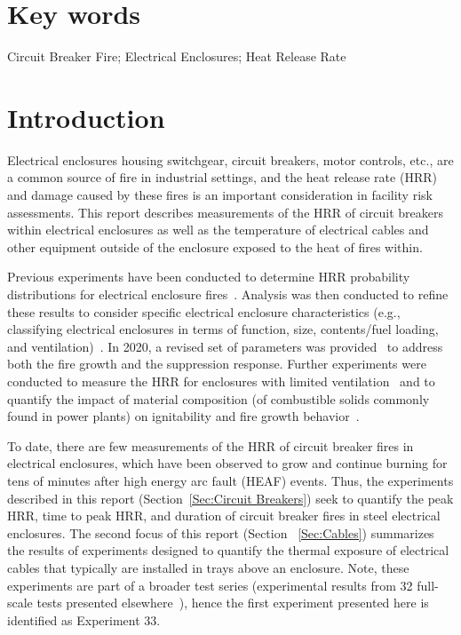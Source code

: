\documentclass[12pt]{article}
\begin{document}
\section*{Key words}
\normalsize Circuit Breaker Fire; Electrical Enclosures; Heat Release Rate\\
\pagebreak
\begin{center}
 \tableofcontents
 \listoftables
 \listoffigures
\end{center}

\pagebreak


\section{Introduction}

Electrical enclosures housing switchgear, circuit breakers, motor controls, etc., are a common source of fire in industrial settings, and the heat release rate (HRR) and damage caused by these fires is an important consideration in facility risk assessments. This report describes measurements of the HRR of circuit breakers within electrical enclosures as well as the temperature of electrical cables and other equipment outside of the enclosure exposed to the heat of fires within.

Previous experiments have been conducted to determine HRR probability distributions for electrical enclosure fires~\cite{NUREG/CR-7197}. Analysis was then conducted to refine these results to consider specific electrical enclosure characteristics (e.g., classifying electrical enclosures in terms of function, size, contents/fuel loading, and ventilation)~\cite{NUREG-2178}. In 2020, a revised set of parameters was provided~\cite{NUREG2230} to address both the fire growth and the suppression response. Further experiments were conducted to measure the HRR for enclosures with limited ventilation~\cite{OLIVE-FIRE} and to quantify the impact of material composition (of combustible solids commonly found in power plants) on ignitability and fire growth behavior~\cite{leventon2024nist}. 

To date, there are few measurements of the HRR of circuit breaker fires in electrical enclosures, which have been observed to grow and continue burning for tens of minutes after high energy arc fault (HEAF) events. Thus, the experiments described in this report (Section~\ref{Sec:Circuit Breakers}) seek to quantify the peak HRR, time to peak HRR, and duration of circuit breaker fires in steel electrical enclosures. The second focus of this report (Section~ \ref{Sec:Cables}) summarizes the results of experiments designed to quantify the thermal exposure of electrical cables that typically are installed in trays above an enclosure. Note, these experiments are part of a broader test series (experimental results from 32 full-scale tests presented elsewhere~\cite{OLIVE-FIRE}), hence the first experiment presented here is identified as Experiment 33.
\end{document}
